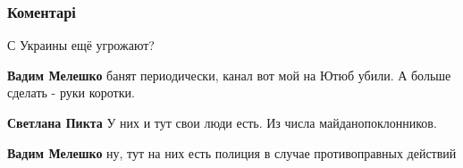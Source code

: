  
 
 
 
 
\subsubsection{Коментарі}

\begin{itemize}
 
С Украины ещё угрожают?

\begin{itemize}
 
\textbf{Вадим Мелешко} банят периодически, канал вот мой на Ютюб убили. А больше сделать - руки коротки.

 
\textbf{Светлана Пикта} У них и тут свои люди есть. Из числа майданопоклонников.

 
\textbf{Вадим Мелешко} ну, тут на них есть полиция в случае противоправных действий

 

\end{itemize}
\end{itemize}
